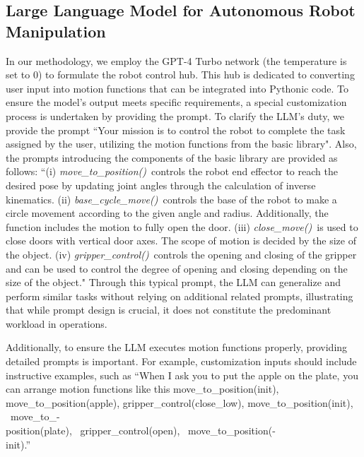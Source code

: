 \documentclass[letterpaper,conference]{ieeeconf}
\begin{document}
\subsection{Large Language Model for Autonomous Robot Manipulation}
In our methodology, we employ the GPT-4 Turbo network (the temperature is set to 0) to formulate the robot control hub. This hub is dedicated to converting user input into motion functions that can be integrated into Pythonic code. To ensure the model's output meets specific requirements, a special customization process is undertaken by providing the prompt. To clarify the LLM's duty, we provide the prompt ``Your mission is to control the robot to complete the task assigned by the user, utilizing the motion functions from the basic library". Also, the prompts introducing the components of the basic library are provided as follows:
``(i) \textquotesingle \textit{move\_to\_position()}\textquotesingle\ controls the robot end effector to reach the desired pose by updating joint angles through the calculation of inverse kinematics.
(ii) \textquotesingle \textit{base\_cycle\_move()}\textquotesingle\ controls the base of the robot to make a circle movement according to the given angle and radius.
Additionally, the function includes the motion to fully open the door.
(iii) \textquotesingle \textit{close\_move()}\textquotesingle\ is used to close doors with vertical door axes. The scope of motion is decided by the size of the object.
(iv) \textquotesingle \textit{gripper\_control()}\textquotesingle\ controls the opening and closing of the gripper and can be used to control the degree of opening and closing depending on the size of the object."
Through this typical prompt, the LLM can generalize and perform similar tasks without relying on additional related prompts, illustrating that while prompt design is crucial, it does not constitute the predominant workload in operations.

Additionally, to ensure the LLM executes motion functions properly, providing detailed prompts is important. For example, customization inputs should include instructive examples, such as ``When I ask you to put the apple on the plate, you can arrange motion functions like this \textquotesingle move\_to\_position(init)\textquotesingle, \textquotesingle move\_to\_position(apple)\textquotesingle, \textquotesingle gripper\_control(close\_low)\textquotesingle, \textquotesingle move\_to\_position(init)\textquotesingle, \textquotesingle\ move\_to\_-\\position(plate)\textquotesingle, \textquotesingle\ gripper\_control(open)\textquotesingle, \textquotesingle\ move\_to\_position(-\\init)\textquotesingle.''
\end{document}
